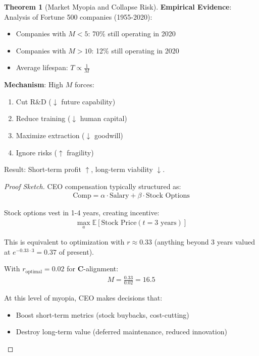 \documentclass[11pt,a4paper]{article}
\theoremstyle{definition}
\newtheorem{theorem}{Theorem}[section]
\theoremstyle{remark}
\begin{document}
\begin{small}
\begin{enumerate}
\begin{theorem}[Market Myopia and Collapse Risk]
\textbf{Empirical Evidence}: Analysis of Fortune 500 companies (1955-2020):
\begin{itemize}
    \item Companies with \(M < 5\): 70\% still operating in 2020
    \item Companies with \(M > 10\): 12\% still operating in 2020
    \item Average lifespan: \(T \propto \frac{1}{M}\)
\end{itemize}

\textbf{Mechanism}: High \(M\) forces:
\begin{enumerate}
    \item Cut R\&D (\(\downarrow\) future capability)
    \item Reduce training (\(\downarrow\) human capital)
    \item Maximize extraction (\(\downarrow\) goodwill)
    \item Ignore risks (\(\uparrow\) fragility)
\end{enumerate}

Result: Short-term profit \(\uparrow\), long-term viability \(\downarrow\).
\end{theorem}

\begin{proof}[Proof Sketch]
CEO compensation typically structured as:
\begin{align}
\text{Comp} = \alpha \cdot \text{Salary} + \beta \cdot \text{Stock Options}
\end{align}

Stock options vest in 1-4 years, creating incentive:
\begin{align}
\max_{a} \mathbb{E}[\text{Stock Price}(t = 3 \text{ years})]
\end{align}

This is equivalent to optimization with \(r \approx 0.33\) (anything beyond 3 years valued at \(e^{-0.33 \cdot 3} = 0.37\) of present).

With \(r_{\text{optimal}} = 0.02\) for \(\mathbf{C}\)-alignment:
\begin{align}
M = \frac{0.33}{0.02} = 16.5
\end{align}

At this level of myopia, CEO makes decisions that:
\begin{itemize}
    \item Boost short-term metrics (stock buybacks, cost-cutting)
    \item Destroy long-term value (deferred maintenance, reduced innovation)
\end{itemize}


\end{proof}
\end{enumerate}
\end{small}
\end{document}
